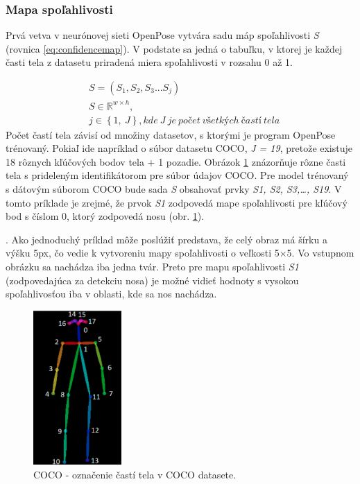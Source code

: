 \documentclass[slovak,master,dept460,male,cpp,cpdeclaration]{diploma}
\begin{document}
\subsubsection{Mapa spoľahlivosti}
Prvá vetva v neurónovej sieti OpenPose vytvára sadu máp spoľahlivosti \textit{S} (rovnica \ref{eq:confidencemap}). V podstate sa jedná o tabuľku, v ktorej je každej časti tela z datasetu priradená miera spoľahlivosti v rozsahu 0 až 1. 

\begin{eqnarray}
& S = (S_{1}, S_{2}, S_{3} ... S_{j}) \label{eq:confidencemap}\\
& S\in\mathbb{R}^{w \times  h},\nonumber\\
& j\in \left \{1,\: J  \right \}, kde\: J\: je\: počet\: všetkých\: častí\: tela\nonumber
\end{eqnarray}
Počet častí tela závisí od množiny datasetov, s ktorými je program OpenPose trénovaný. Pokiaľ ide napríklad o súbor datasetu COCO\cite{lin2014microsoft}, \textit{J = 19}, pretože existuje 18 rôznych kľúčových bodov tela + 1 pozadie. Obrázok \ref{fig:cocoDataset} znázorňuje rôzne časti tela s prideleným identifikátorom pre súbor údajov COCO. Pre model trénovaný s dátovým súborom COCO bude sada \textit{S} obsahovať prvky \textit{S1, S2, S3,…, S19}. V tomto príklade je zrejmé, že prvok \textit{S1} zodpovedá mape spoľahlivosti pre kľúčový bod s číslom 0, ktorý zodpovedá nosu (obr. \ref{fig:cocoDataset}).\par. Ako jednoduchý príklad môže poslúžiť predstava, že celý obraz má šírku a výšku 5px, čo vedie k vytvoreniu  mapy spoľahlivosti o veľkosti 5$\times$5. Vo vstupnom obrázku sa nachádza iba jedna tvár. Preto pre mapu spoľahlivosti \textit{S1} (zodpovedajúca za detekciu nosa) je možné vidieť hodnoty s vysokou spoľahlivosťou iba v oblasti, kde sa nos nachádza.\bigskip

\begin{figure}[H]
	\centering
	\includegraphics[width=0.3\textwidth]{Figures/cocoDataset.png}
	\caption{COCO - označenie častí tela v COCO datasete.\cite{cocoDataset}}
	\label{fig:cocoDataset}
\end{figure}
\end{document}
